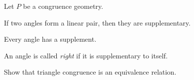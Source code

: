 \begin{prop}
Let \(P\) be a congruence geometry.
\begin{proplist}
\item If two angles form a linear pair, then they are supplementary.
\item Every angle has a supplement.
\end{proplist}
\end{prop}

\begin{dfn}
An angle is called \emph{right} if it is supplementary to itself.
\end{dfn}


\Exercises%

\begin{exercise}
Show that triangle congruence is an equivalence relation.
\end{exercise}
